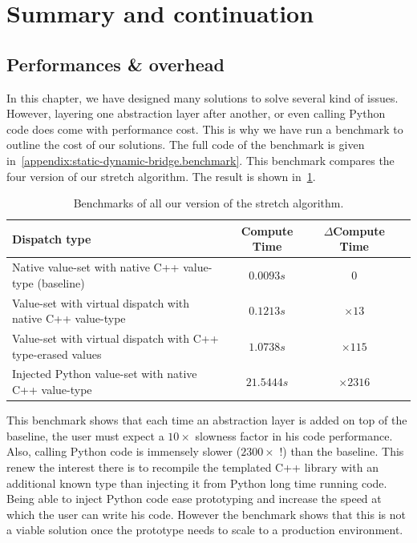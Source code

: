 \section{Summary and continuation}

\subsection{Performances \& overhead}

In this chapter, we have designed many solutions to solve several kind of issues. However, layering one abstraction
layer after another, or even calling Python code does come with performance cost. This is why we have run a benchmark to
outline the cost of our solutions. The full code of the benchmark is given
in~\cref{appendix:static-dynamic-bridge.benchmark}. This benchmark compares the four version of our stretch algorithm.
The result is shown in~\cref{table:static.dynamic.perfs}.


\begin{table}[htbp]
  \begin{tabular}{l|ccc}
    \toprule
    Dispatch type                                               & Compute Time & $\Delta{}$Compute Time \\ \midrule
    Native value-set with native C++ value-type (baseline)      & $0.0093s$    & $0$                    \\
    Value-set with virtual dispatch with native C++ value-type  & $0.1213s$    & $\times 13$            \\
    Value-set with virtual dispatch with C++ type-erased values & $1.0738s$    & $\times 115$           \\
    Injected Python value-set with native C++ value-type        & $21.5444s$   & $\times 2316$          \\
    \bottomrule
  \end{tabular}
  \caption{Benchmarks of all our version of the stretch algorithm.}
  \label{table:static.dynamic.perfs}
\end{table}

This benchmark shows that each time an abstraction layer is added on top of the baseline, the user must expect a
$10\times$ slowness factor in his code performance. Also, calling Python code is immensely slower ($2300\times$ !) than
the baseline. This renew the interest there is to recompile the templated C++ library with an additional known type than
injecting it from Python long time running code. Being able to inject Python code ease prototyping and increase the
speed at which the user can write his code. However the benchmark shows that this is not a viable solution once the
prototype needs to scale to a production environment.


